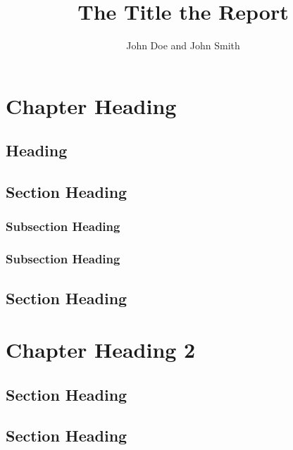 \documentclass{aaltoseries}
\author{John Doe and John Smith}
\title{The Title the Report}
\begin{document}
\draftabstract{\lipsum[1-3]}

\begin{preface}%
\lipsum[1-4]
\end{preface}

\tableofcontents

\chapter{Chapter Heading}
\section{Heading}
\lipsum[1-4]
\section{Section Heading}
\lipsum[5-6]
\subsection{Subsection Heading}
\lipsum[7-8]
\subsection{Subsection Heading}
\lipsum[9-10]
\section{Section Heading}
\lipsum[11-12]


\chapter{Chapter Heading 2}
\section{Section Heading}
\lipsum[1-4]
\section{Section Heading}
\lipsum[5-6]
\end{document}
